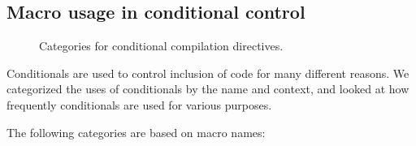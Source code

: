 \documentclass[10pt]{article}
\newcommand{\captionsmall}[1]{\caption[]{\small #1}}
\begin{document}
\subsection{Macro usage in conditional control}

\begin{figure}
\centerline{}
\captionsmall{Categories for conditional compilation directives.}
\label{fig:ccd-categories}
\end{figure}

Conditionals are used to control inclusion of code for many different
reasons.  We categorized the uses of conditionals by the name and
context, and looked at how frequently conditionals are used for various
purposes.


The following categories are based on macro names:
\end{document}
